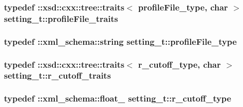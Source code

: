 \subsubsection[{\texorpdfstring{profile\+File\+\_\+traits}{profileFile_traits}}]{\setlength{\rightskip}{0pt plus 5cm}typedef \+::xsd\+::cxx\+::tree\+::traits$<$ {\bf profile\+File\+\_\+type}, char $>$ {\bf setting\+\_\+t\+::profile\+File\+\_\+traits}}\hypertarget{classsetting__t_af0663c89478aa719ca80575a0f8f0585}{}\label{classsetting__t_af0663c89478aa719ca80575a0f8f0585}
\subsubsection[{\texorpdfstring{profile\+File\+\_\+type}{profileFile_type}}]{\setlength{\rightskip}{0pt plus 5cm}typedef \+::{\bf xml\+\_\+schema\+::string} {\bf setting\+\_\+t\+::profile\+File\+\_\+type}}\hypertarget{classsetting__t_afaef422486c04366dea99f1c838feb59}{}\label{classsetting__t_afaef422486c04366dea99f1c838feb59}
\subsubsection[{\texorpdfstring{r\+\_\+cutoff\+\_\+traits}{r_cutoff_traits}}]{\setlength{\rightskip}{0pt plus 5cm}typedef \+::xsd\+::cxx\+::tree\+::traits$<$ {\bf r\+\_\+cutoff\+\_\+type}, char $>$ {\bf setting\+\_\+t\+::r\+\_\+cutoff\+\_\+traits}}\hypertarget{classsetting__t_add5ef63c1e740878483b913818829da3}{}\label{classsetting__t_add5ef63c1e740878483b913818829da3}
\subsubsection[{\texorpdfstring{r\+\_\+cutoff\+\_\+type}{r_cutoff_type}}]{\setlength{\rightskip}{0pt plus 5cm}typedef \+::{\bf xml\+\_\+schema\+::float\+\_\+} {\bf setting\+\_\+t\+::r\+\_\+cutoff\+\_\+type}}\hypertarget{classsetting__t_ac5da16857addda387f3269e0a1a0cafa}{}\label{classsetting__t_ac5da16857addda387f3269e0a1a0cafa}
